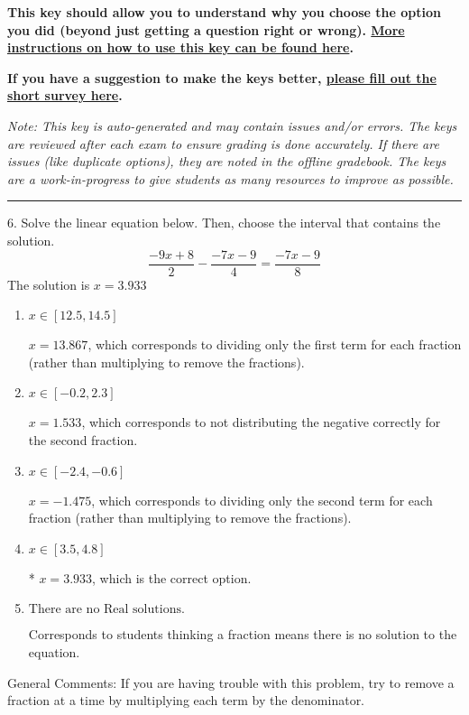 \documentclass{article}[14pt]
\begin{document}
\textbf{This key should allow you to understand why you choose the option you did (beyond just getting a question right or wrong). \href{https://xronos.clas.ufl.edu/mac1105spring2020/courseDescriptionAndMisc/Exams/LearningFromResults}{More instructions on how to use this key can be found here}.}

\textbf{If you have a suggestion to make the keys better, \href{https://forms.gle/CZkbZmPbC9XALEE88}{please fill out the short survey here}.}

\textit{Note: This key is auto-generated and may contain issues and/or errors. The keys are reviewed after each exam to ensure grading is done accurately. If there are issues (like duplicate options), they are noted in the offline gradebook. The keys are a work-in-progress to give students as many resources to improve as possible.}

\rule{\textwidth}{0.4pt}

6. Solve the linear equation below. Then, choose the interval that contains the solution.
$$ \frac{-9 x + 8}{2} - \frac{-7 x - 9}{4} = \frac{-7 x - 9}{8} $$ 
The solution is $ x = 3.933 $ 

\begin{enumerate}[label=\Alph*.] 
\item $ x \in [12.5, 14.5] $ 

  $x = 13.867$, which corresponds to dividing only the first term for each fraction (rather than multiplying to remove the fractions). 
\item $ x \in [-0.2, 2.3] $ 

  $x = 1.533$, which corresponds to not distributing the negative correctly for the second fraction. 
\item $ x \in [-2.4, -0.6] $ 

  $x = -1.475$, which corresponds to dividing only the second term for each fraction (rather than multiplying to remove the fractions). 
\item $ x \in [3.5, 4.8] $ 

 * $x = 3.933$, which is the correct option. 
\item $ \text{There are no Real solutions.} $ 

 Corresponds to students thinking a fraction means there is no solution to the equation. 
\end{enumerate} 
 
General Comments: If you are having trouble with this problem, try to remove a fraction at a time by multiplying each term by the denominator.
\end{document}

